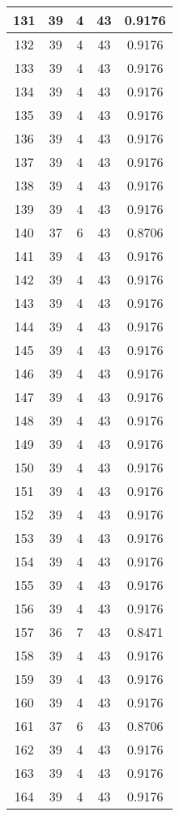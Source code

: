 \documentclass[letterpaper, 12pt]{article}
\begin{document}
\begin{longtable}{|c|c|c|c|c|}
131 & 39 & 4 & 43 & 0.9176 \\
\hline
132 & 39 & 4 & 43 & 0.9176 \\
\hline
133 & 39 & 4 & 43 & 0.9176 \\
\hline
134 & 39 & 4 & 43 & 0.9176 \\
\hline
135 & 39 & 4 & 43 & 0.9176 \\
\hline
136 & 39 & 4 & 43 & 0.9176 \\
\hline
137 & 39 & 4 & 43 & 0.9176 \\
\hline
138 & 39 & 4 & 43 & 0.9176 \\
\hline
139 & 39 & 4 & 43 & 0.9176 \\
\hline
140 & 37 & 6 & 43 & 0.8706 \\
\hline
141 & 39 & 4 & 43 & 0.9176 \\
\hline
142 & 39 & 4 & 43 & 0.9176 \\
\hline
143 & 39 & 4 & 43 & 0.9176 \\
\hline
144 & 39 & 4 & 43 & 0.9176 \\
\hline
145 & 39 & 4 & 43 & 0.9176 \\
\hline
146 & 39 & 4 & 43 & 0.9176 \\
\hline
147 & 39 & 4 & 43 & 0.9176 \\
\hline
148 & 39 & 4 & 43 & 0.9176 \\
\hline
149 & 39 & 4 & 43 & 0.9176 \\
\hline
150 & 39 & 4 & 43 & 0.9176 \\
\hline
151 & 39 & 4 & 43 & 0.9176 \\
\hline
152 & 39 & 4 & 43 & 0.9176 \\
\hline
153 & 39 & 4 & 43 & 0.9176 \\
\hline
154 & 39 & 4 & 43 & 0.9176 \\
\hline
155 & 39 & 4 & 43 & 0.9176 \\
\hline
156 & 39 & 4 & 43 & 0.9176 \\
\hline
157 & 36 & 7 & 43 & 0.8471 \\
\hline
158 & 39 & 4 & 43 & 0.9176 \\
\hline
159 & 39 & 4 & 43 & 0.9176 \\
\hline
160 & 39 & 4 & 43 & 0.9176 \\
\hline
161 & 37 & 6 & 43 & 0.8706 \\
\hline
162 & 39 & 4 & 43 & 0.9176 \\
\hline
163 & 39 & 4 & 43 & 0.9176 \\
\hline
164 & 39 & 4 & 43 & 0.9176 \\

\end{longtable}
\end{document}
